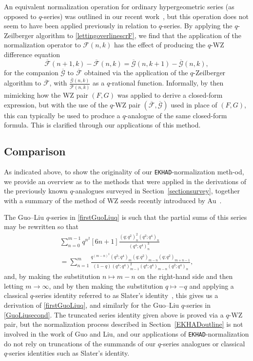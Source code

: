 \documentclass[12pt]{article}
\begin{document}
 An equivalent normalization operation for ordinary hypergeometric series (as opposed to $q$-series) was outlined in our recent 
 work~\cite{Campbell2025}, but this operation does not seem to have been applied previously in relation to $q$-series. 
 By applying the $q$-Zeilberger algorithm to 
 \eqref{lettingoverlinescrF}, we find that the application of the normalization operator
 to $\mathscr{F}(n, k)$ has the effect of producing the $q$-WZ difference equation
 $$ \overline{\mathscr{F}}(n+1, k) - \overline{\mathscr{F}}(n, k) 
 = \overline{\mathscr{G}}(n, k+1) - \overline{\mathscr{G}}(n, k), $$ 
 for the companion $\overline{\mathscr{G}}$ to 
 $\overline{\mathscr{F}}$ obtained via the application of the $q$-Zeilberger algorithm
 to $\overline{\mathscr{F}}$, 
 with $\frac{ \overline{\mathscr{G}}(n, k) }{ \overline{\mathscr{F}}(n, k) }$
 as a $q$-rational function. 
 Informally, by then mimicking how the WZ pair $(F, G)$ was applied 
 to derive a closed-form expression, 
 but with the use of the $q$-WZ pair $( \overline{\mathscr{F}}, \overline{\mathscr{G}} )$
 used in place of $(F, G)$, 
 this can typically be used to produce a $q$-analogue of the same closed-form formula. 
 This is clarified through our applications of this method. 

 \subsection{Comparison}\label{sectionCompare}
 As indicated above, to show the originality of our {\tt EKHAD}-normalization meth-od, we provide an overview as to the methods that 
 were applied in the derivations of the previously known $q$-analogues surveyed in Section~\ref{sectionsurvey}, together with a 
 summary of the method of WZ seeds recently introduced by Au~\cite{Au2025}. 

 The Guo--Liu $q$-series in \eqref{firstGuoLiuq}
 is such that the partial sums of this series may be rewritten so that 
\begin{multline*}
 \sum_{n=0}^{m-1} q^{n^2} [6n+1]
 \frac{ (q;q^2)_{n}^{2} (q^2;q^4)_{n} }{ (q^4;q^4)_{n}^{3} } \\ 
 = \sum_{n=1}^{m} \frac{q^{(m-n)^2} (q^2;q^4)_{m} 
 (q;q^2)_{m-n} (q;q^2)_{m+n-1} }{ (1-q) (q^4;q^4)_{m-1}^{2} (q^4;q^4)_{m-n} 
 (q^2;q^4)_{n}}, 
\end{multline*}
 and, by making the substitution $n \mapsto m - n$ on the right-hand side and then letting $m \to \infty$, and by then making the 
 substitution $q \mapsto -q$ and applying a classical $q$-series identity referred to as Slater's identity~\cite{Slater1952}, this gives us a 
 derivation of \eqref{firstGuoLiuq}, and similarly for the Guo--Liu $q$-series in \eqref{GuoLiusecond}. The truncated series identity given 
 above is proved via a $q$-WZ pair, 
 but the normalization process described in 
 Section~\ref{EKHADoutline} is 
 not involved in the work of Guo and Liu, 
 and our applications of {\tt EKHAD}-normalization do not rely 
 on truncations of the summands of our $q$-series analogues 
 or classical $q$-series identities such as Slater's identity. 
\end{document}
